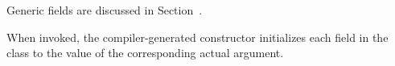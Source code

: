 Generic fields are discussed in Section~.

When invoked, the compiler-generated constructor initializes each field in the class to the
value of the corresponding actual argument.  

%
%

% 

